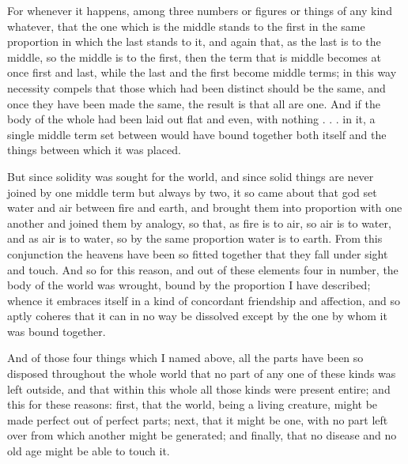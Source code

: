  For whenever it happens, among three numbers or figures or things of any kind whatever, that the one which is the middle stands to the first in the same proportion in which the last stands to it, and again that, as the last is to the middle, so the middle is to the first, then the term that is middle becomes at once first and last, while the last and the first become middle terms; in this way necessity compels that those which had been distinct should be the same, and once they have been made the same, the result is that all are one. And if the body of the whole had been laid out flat and even, with nothing . . . in it, a single middle term set between would have bound together both itself and the things between which it was placed.

 But since solidity was sought for the world, and since solid things are never joined by one middle term but always by two, it so came about that god set water and air between fire and earth, and brought them into proportion with one another and joined them by analogy, so that, as fire is to air, so air is to water, and as air is to water, so by the same proportion water is to earth. From this conjunction the heavens have been so fitted together that they fall under sight and touch. And so for this reason, and out of these elements four in number, the body of the world was wrought, bound by the proportion I have described; whence it embraces itself in a kind of concordant friendship and affection, and so aptly coheres that it can in no way be dissolved except by the one by whom it was bound together.

 And of those four things which I named above, all the parts have been so disposed throughout the whole world that no part of any one of these kinds was left outside, and that within this whole all those kinds were present entire; and this for these reasons: first, that the world, being a living creature, might be made perfect out of perfect parts; next, that it might be one, with no part left over from which another might be generated; and finally, that no disease and no old age might be able to touch it.

